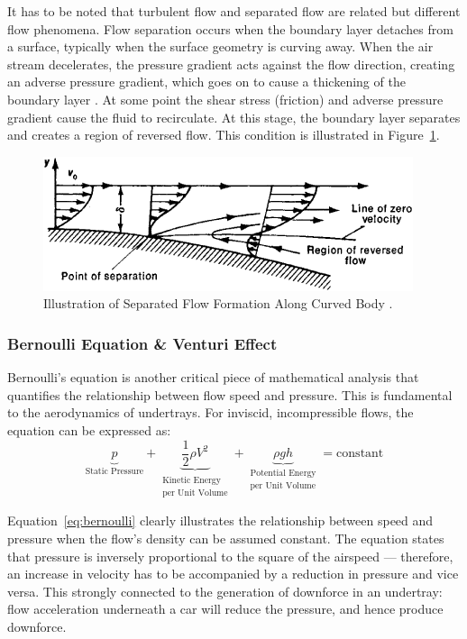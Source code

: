 \noindent It has to be noted that turbulent flow and separated flow are related but different flow phenomena. Flow separation occurs when the boundary layer detaches from a surface, typically when the surface geometry is curving away. When the air stream decelerates, the pressure gradient acts against the flow direction, creating an adverse pressure gradient, which goes on to cause a thickening of the boundary layer \cite{Scibor-Rylski1984RoadAerodynamics}. At some point the shear stress (friction) and adverse pressure gradient cause the fluid to recirculate. At this stage, the boundary layer separates and creates a region of reversed flow. This condition is illustrated in Figure~\ref{fig:flow separation}.

\begin{figure}[!ht]
    \centering
    \includegraphics[scale= 0.8]{Figures/flow_separation.png}
    \caption{Illustration of Separated Flow Formation Along Curved Body \cite{Anonymous1979SeparationDictionary}.}
    \label{fig:flow separation}
\end{figure}

\subsubsection{Bernoulli Equation \& Venturi Effect}
Bernoulli's equation is another critical piece of mathematical analysis that quantifies the relationship between flow speed and pressure. This is fundamental to the aerodynamics of undertrays. For inviscid, incompressible flows, the equation can be expressed as:
\begin{equation}
   \underbrace{p}_\textrm{Static Pressure} + \underbrace{\frac{1}{2} \rho V^{2}}_{\substack{\text{Kinetic Energy} \\ \text{per Unit Volume}}} + \underbrace{\rho g h}_{\substack{\text{Potential Energy} \\ \text{per Unit Volume}}} = \text{constant}
    \label{eq:bernoulli}
\end{equation}

\noindent Equation~\ref{eq:bernoulli} clearly illustrates the relationship between speed and pressure when the flow's density can be assumed constant. The equation states that pressure is inversely proportional to the square of the airspeed --- therefore, an increase in velocity has to be accompanied by a reduction in pressure and vice versa. This strongly connected to the generation of downforce in an undertray: flow acceleration underneath a car will reduce the pressure, and hence produce downforce.


